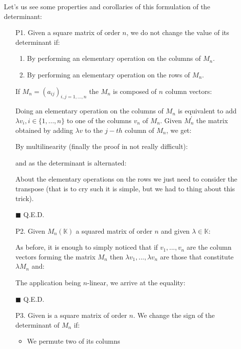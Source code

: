	Let's us see some properties and corollaries of this formulation of the determinant:
	\begin{enumerate}
		\item[P1.] Given a square matrix of order $n$, we do not change the value of its determinant if:
		\begin{enumerate}
			\item By performing an elementary operation on the columns of $M_n$.

			\item By performing an elementary operation on the rows of $M_n$.
		\end{enumerate}
		\begin{dem}
		If $M_n=(a_{ij})_{i,j=1,...,n}$ the $M_n$ is composed of $n$ column vectors:
		
		Doing an elementary operation on the columns of $M_n$ is equivalent to add $\lambda v_i,i \in \{1,...,n\}$ to one of the columns $v_n$ of $M_n$. Given $M_n^{\prime}$ the matrix obtained by adding $\lambda v$ to the $j-th$ column of $M_n$, we get:
		
		By multilinearity (finally the proof in not really difficult):
		
		and as the determinant is alternated:
		
		About the elementary operations on the rows we just need to consider the transpose (that is to cry such it is simple, but we had to thing about this trick).
		\begin{flushright}
			$\blacksquare$  Q.E.D.
		\end{flushright}
		\end{dem}
		
		\item[P2.] Given $M_n(\mathbb{K})$ a squared matrix of order $n$ and given $\lambda \in \mathbb{K}$:
		
		\begin{dem}
		As before, it is enough to simply noticed that if $v_1,...,v_n$ are the column vectors forming the matrix $M_n$ then $\lambda v_1,...,\lambda v_n$ are those that constitute $\lambda M_n$ and:
		
		The application being $n$-linear, we arrive at the equality:
		
		\begin{flushright}
			$\blacksquare$  Q.E.D.
		\end{flushright}
		\end{dem}
		
		\item[P3.] Given is a square matrix of order $n$. We change the sign of the determinant of $M_n$ if:
		\begin{itemize}
			\item We permute two of its columns
	

\end{itemize}
\end{enumerate}

